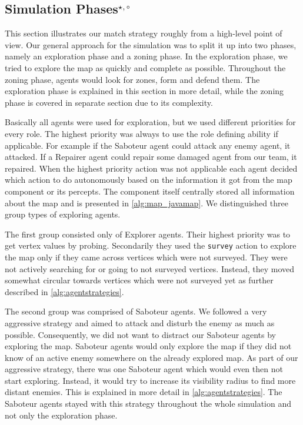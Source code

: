 \subsection[Simulation Phases]{Simulation Phases$^{\star,\circ}$}\label{arc:simulation}
This section illustrates our match strategy roughly from a high-level point of view.
Our general approach for the simulation was to split it up into two phases, namely an exploration phase and a zoning phase.
In the exploration phase, we tried to explore the map as quickly and complete as possible.
Throughout the zoning phase, agents would look for zones, form and defend them.
The exploration phase is explained in this section in more detail, while the zoning phase is covered in separate section due to its complexity.

Basically all agents were used for exploration, but we used different priorities for every role.
The highest priority was always to use the role defining ability if applicable.
For example if the Saboteur agent could attack any enemy agent, it attacked.
If a Repairer agent could repair some damaged agent from our team, it repaired.
When the highest priority action was not applicable each agent decided which action to do autonomously based on the information it got from the map component or its percepts.
The component itself centrally stored all information about the map and is presented in \autoref{alg:map_javamap}.
We distinguished three group types of exploring agents.

The first group consisted only of Explorer agents.
Their highest priority was to get vertex values by probing.
Secondarily they used the \texttt{survey} action to explore the map only if they came across vertices which were not surveyed.
They were not actively searching for or going to not surveyed vertices.
Instead, they moved somewhat circular towards vertices which were not surveyed yet as further described in \autoref{alg:agentstrategies}.

The second group was comprised of Saboteur agents.
We followed a very aggressive strategy and aimed to attack and disturb the enemy as much as possible.
Consequently, we did not want to distract our Saboteur agents by exploring the map.
Saboteur agents would only explore the map if they did not know of an active enemy somewhere on the already explored map.
As part of our aggressive strategy, there was one Saboteur agent which would even then not start exploring.
Instead, it would try to increase its visibility radius to find more distant enemies.
This is explained in more detail in \autoref{alg:agentstrategies}.
The Saboteur agents stayed with this strategy throughout the whole simulation and not only the exploration phase.

